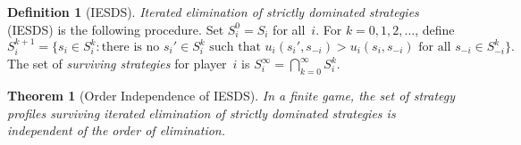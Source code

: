 \documentclass[11pt,a4paper]{article}
\theoremstyle{definition}
\newtheorem{definition}{Definition}[section]
\theoremstyle{plain}
\newtheorem{theorem}{Theorem}[section]
\theoremstyle{remark}
\begin{document}
\begin{definition}[IESDS]
\label{def:iesds}
\emph{Iterated elimination of strictly dominated strategies} (IESDS) is the following
procedure. Set $S_i^0 = S_i$ for all~$i$. For $k = 0, 1, 2, \ldots$, define
\[
    S_i^{k+1} = \big\{s_i \in S_i^k : \text{there is no } s_i' \in S_i^k
    \text{ such that } u_i(s_i', s_{-i}) > u_i(s_i, s_{-i})
    \text{ for all } s_{-i} \in S_{-i}^k\big\}.
\]
The set of \emph{surviving strategies} for player~$i$ is
$S_i^\infty = \bigcap_{k=0}^\infty S_i^k$.
\end{definition}

\begin{theorem}[Order Independence of IESDS]
\label{thm:iesds_order}
In a finite game, the set of strategy profiles surviving iterated elimination of
strictly dominated strategies is independent of the order of elimination.
\end{theorem}
\end{document}

